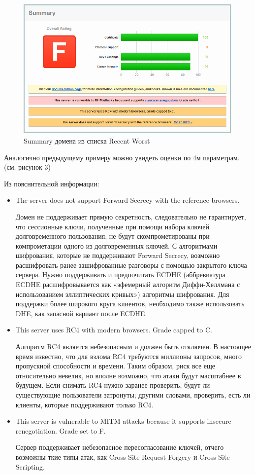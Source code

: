 \documentclass[11pt, a4paper]{article}		%
\begin{document}
\begin{figure}[h!]
\centering
\includegraphics[scale=0.8]{res/summary_worst_domain}
\caption{Summary домена из списка Recent Worst}
\end{figure}

Аналогично предыдущему примеру можно увидеть оценки по 4м параметрам. (см. рисунок 3)

Из пояснительной информации:

\begin{itemize}

\item The server does not support Forward Secrecy with the reference browsers.

Домен не поддерживает прямую секретность, следовательно не гарантирует, что сессионные ключи, полученные при помощи набора ключей долговременного пользования, не будут скомпрометированы при компрометации одного из долговременных ключей.
С алгоритмами шифрования, которые не поддерживают Forward Secrecy, возможно расшифровать ранее зашифрованные разговоры с помощью закрытого ключа сервера. Нужно поддерживать и предпочитать ECDHE (аббревиатура ECDHE расшифровывается как «эфемерный алгоритм Диффи-Хеллмана с использованием эллиптических кривых») алгоритмы шифрования. Для поддержки более широкого круга клиентов, необходимо также использовать DHE, как запасной вариант после ECDHE.

\item This server uses RC4 with modern browsers. Grade capped to C.

Алгоритм RC4 является небезопасным и должен быть отключен. В настоящее время известно, что для взлома RC4 требуются миллионы запросов, много пропускной способности и времени. Таким образом, риск все еще относительно невелик, но вполне возможно, что атаки будут масштабнее в будущем. Если снимать RC4 нужно заранее проверить, будут ли существующие пользователи затронуты; другими словами, проверить, есть ли клиенты, которые поддерживают только RC4.

\item This server is vulnerable to MITM attacks because it supports insecure renegotiation. Grade set to F.

Сервер поддерживает небезопасное пересогласование ключей, отчего возможны ткие типы атак, как Cross-Site Request Forgery и Cross-Site Scripting.

\end{itemize}
\end{document}
